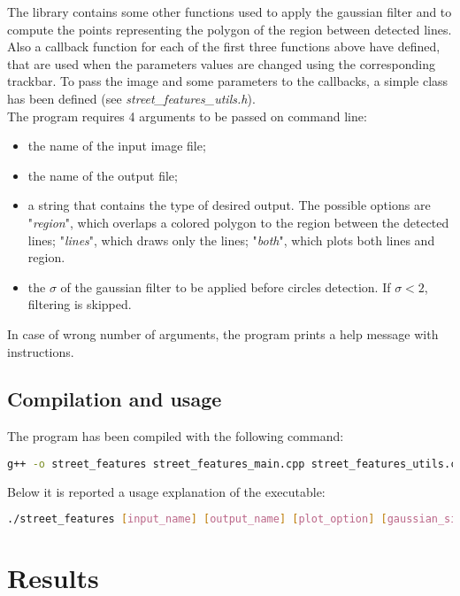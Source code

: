 \documentclass[11pt,a4paper]{article}
\begin{document}
The library contains some other functions used to apply the gaussian filter and to compute the points representing the polygon of the region between detected lines. \\
Also a callback function for each of the first three functions above have defined, that are used when the parameters values are changed using the corresponding trackbar. To pass the image and some parameters to the callbacks, a simple class has been defined (see \textit{street\_features\_utils.h}). \\

The program requires 4 arguments to be passed on command line: 
\begin{itemize}
	\item the name of the input image file;
	\item the name of the output file;
	\item a string that contains the type of desired output. The possible options are "\textit{region}", which overlaps a colored polygon to the region between the detected lines; "\textit{lines}", which draws only the lines; "\textit{both}", which plots both lines and region.
	\item the $\sigma$ of the gaussian filter to be applied before circles detection. If $\sigma < 2$, filtering is skipped. 
\end{itemize}
In case of wrong number of arguments, the program prints a help message with instructions.

\subsection{Compilation and usage}

The program has been compiled with the following command:
\begin{lstlisting}[language=BASH,numbers=none]
	g++ -o street_features street_features_main.cpp street_features_utils.cpp `pkg-config --cflags --libs opencv`
\end{lstlisting}

Below it is reported a usage explanation of the executable:
\begin{lstlisting}[language=BASH,numbers=none] 
	./street_features [input_name] [output_name] [plot_option] [gaussian_sigma]
\end{lstlisting}


\section{Results} %
\end{document}
